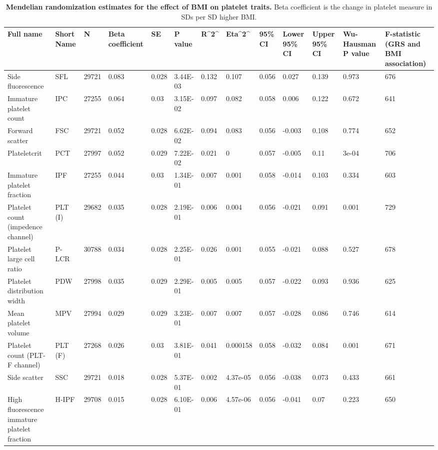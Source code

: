 \documentclass[11pt,twoside]{bristolthesis}
\begin{document}
\begin{landscape}\begin{table}

\caption[Mendelian randomization estimates for the effect of BMI on platelet traits]{\label{tab:BMI-platelets-MR}\textbf{Mendelian randomization estimates for the effect of BMI on platelet traits.} Beta coefficient is the change in platelet measure in SDs per SD higher BMI.}
\centering
\begin{tabu} to 
\toprule
Full name & Short Name & N & Βeta coefficient & SE & P value & R\textasciicircum{}2\textasciicircum{} & Eta\textasciicircum{}2\textasciicircum{} & 95\% CI & Lower 95\% CI & Upper 95\% CI & Wu-Hausman P value & F-statistic (GRS and BMI association)\\
\midrule
Side fluorescence & SFL & 29721 & 0.083 & 0.028 & 3.44E-03 & 0.132 & 0.107 & 0.056 & 0.027 & 0.139 & 0.973 & 676\\
Immature platelet count & IPC & 27255 & 0.064 & 0.03 & 3.15E-02 & 0.097 & 0.082 & 0.058 & 0.006 & 0.122 & 0.672 & 641\\
Forward scatter & FSC & 29721 & 0.052 & 0.028 & 6.62E-02 & 0.094 & 0.083 & 0.056 & -0.003 & 0.108 & 0.774 & 652\\
Plateletcrit & PCT & 27997 & 0.052 & 0.029 & 7.22E-02 & 0.021 & 0 & 0.057 & -0.005 & 0.11 & 3e-04 & 706\\
Immature platelet fraction & IPF & 27255 & 0.044 & 0.03 & 1.34E-01 & 0.007 & 0.001 & 0.058 & -0.014 & 0.103 & 0.334 & 603\\
\addlinespace
Platelet count (impedence channel) & PLT (I) & 29682 & 0.035 & 0.028 & 2.19E-01 & 0.006 & 0.004 & 0.056 & -0.021 & 0.091 & 0.001 & 729\\
Platelet large cell ratio & P-LCR & 30788 & 0.034 & 0.028 & 2.25E-01 & 0.026 & 0.001 & 0.055 & -0.021 & 0.088 & 0.527 & 678\\
Platelet distribution width & PDW & 27998 & 0.035 & 0.029 & 2.29E-01 & 0.005 & 0.005 & 0.057 & -0.022 & 0.093 & 0.936 & 625\\
Mean platelet volume & MPV & 27994 & 0.029 & 0.029 & 3.23E-01 & 0.007 & 0.007 & 0.057 & -0.028 & 0.086 & 0.746 & 614\\
Platelet count (PLT-F channel) & PLT (F) & 27268 & 0.026 & 0.03 & 3.81E-01 & 0.041 & 0.000158 & 0.058 & -0.032 & 0.084 & 0.001 & 671\\
\addlinespace
Side scatter & SSC & 29721 & 0.018 & 0.028 & 5.37E-01 & 0.002 & 4.37e-05 & 0.056 & -0.038 & 0.073 & 0.433 & 661\\
High fluorescence immature platelet fraction & H-IPF & 29708 & 0.015 & 0.028 & 6.10E-01 & 0.006 & 4.57e-06 & 0.056 & -0.041 & 0.07 & 0.223 & 650\\
\bottomrule
\end{tabu}
\end{table}
\end{landscape}
\end{document}
